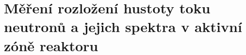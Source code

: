 \section[Měření rozložení hustoty toku]{Měření rozložení hustoty toku neutronů a jejich spektra v aktivní zóně reaktoru}